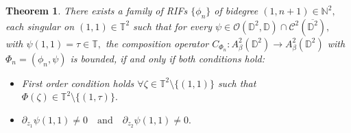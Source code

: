 \documentclass[12pt]{amsart}
\newtheorem{theorem}{Theorem}[section]
\numberwithin{equation}{section}
\begin{document}
\begin{theorem} There exists a family of RIFs $\{\phi_n\}$ of bidegree $(1,n+1)\in\mathbb{N}^2,$ each singular on  $(1,1)\in\mathbb{T}^2$ such that for every $\psi\in\mathcal{O}(\mathbb{D}^2,\mathbb{D})\cap\mathcal{C}^2(\overline{\mathbb{D}^2}),$ with $\psi(1,1)=\tau\in\mathbb{T},$ the composition operator $C_{\Phi_n}:A^2_{\beta}(\mathbb{D}^2)\to A^2_{\beta}(\mathbb{D}^2)$ with $\Phi_n=(\phi_n,\psi)$ is bounded, if and only if both conditions hold:

\begin{itemize}
\item First order condition holds $\forall\zeta\in\mathbb{T}^2\setminus\{(1,1)\}$ such that $\Phi(\zeta)\in\mathbb{T}^2\setminus\{(1,\tau)\}.$
\item  
$\partial_{z_1}\psi(1,1)\neq 0 \quad\mathrm{and}\quad \partial_{z_2}\psi(1,1)\neq0.$
\end{itemize}
\end{theorem}
\end{document}
